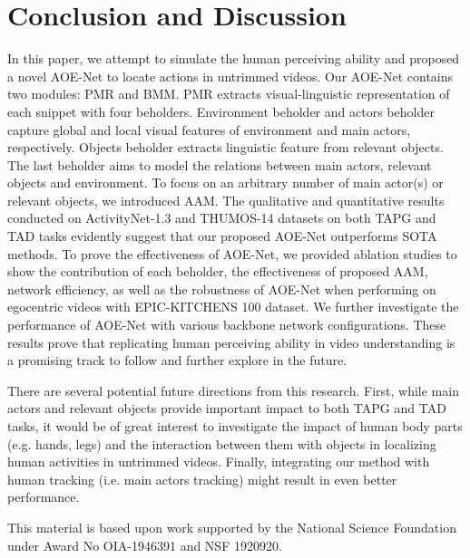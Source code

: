 \documentclass[sn-mathphys]{sn-jnl}
\theoremstyle{thmstyleone}\newtheorem{theorem}{Theorem}\newtheorem{proposition}[theorem]{Proposition}
\theoremstyle{thmstyletwo}\newtheorem{example}{Example}\newtheorem{remark}{Remark}
\theoremstyle{thmstylethree}\newtheorem{definition}{Definition}
\begin{document}
\section{Conclusion and Discussion}
\vspace{-1mm}
In this paper, we attempt to simulate the human perceiving ability and proposed a novel AOE-Net to locate actions in untrimmed videos. Our AOE-Net contains two modules: PMR and BMM. PMR extracts visual-linguistic representation of each snippet with four beholders. Environment beholder and actors beholder capture global and local visual features of environment and main actors, respectively. Objects beholder extracts linguistic feature from relevant objects. The last beholder aims to model the relations between main actors, relevant objects and environment. To focus on an arbitrary number of main actor(s) or relevant objects, we introduced AAM. The qualitative and quantitative results conducted on ActivityNet-1.3 and THUMOS-14 datasets on both TAPG and TAD tasks evidently suggest that our proposed AOE-Net outperforms SOTA methods. To prove the effectiveness of AOE-Net, we provided ablation studies to show the contribution of each beholder, the effectiveness of proposed AAM, network efficiency, as well as the robustness of AOE-Net when performing on egocentric videos with EPIC-KITCHENS 100 dataset. We further investigate the performance of AOE-Net with various backbone network configurations. These results prove that replicating human perceiving ability in video understanding is a promising track to follow and further explore in the future. 

There are several potential future directions from this research. First, while main actors and relevant objects provide important impact to both TAPG and TAD tasks, it would be of great interest to investigate the impact of human body parts (e.g. hands, legs) and the interaction between them with objects in localizing human activities in untrimmed videos. Finally, integrating our method with human tracking (i.e. main actors tracking) might result in even better performance.

This material is based upon work supported by the National Science Foundation under Award No OIA-1946391 and NSF 1920920.

\newpage




\newpage
\end{document}
